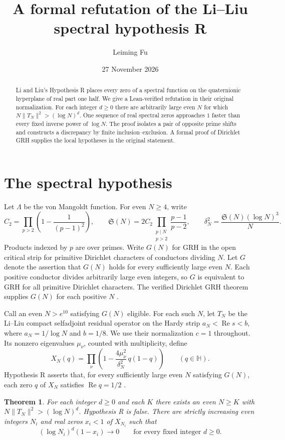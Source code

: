 \documentclass[11pt,a4paper]{article}
\title{A formal refutation of the Li--Liu spectral hypothesis R}
\author{Leiming Fu}
\date{27 November 2026}
\newtheorem{theorem}{Theorem}[section]
\newcommand{\SSg}{\mathfrak S}
\DeclareMathOperator{\Rea}{Re}
\begin{document}
\maketitle
\begin{abstract}
Li and Liu's Hypothesis R places every zero of a spectral function on the quaternionic hyperplane of real part one half. We give a Lean-verified refutation in their original normalization. For each integer $d\ge0$ there are arbitrarily large even $N$ for which $N\|T_N\|^2>(\log N)^d$. One sequence of real spectral zeros approaches $1$ faster than every fixed inverse power of $\log N$. The proof isolates a pair of opposite prime shifts and constructs a discrepancy by finite inclusion--exclusion. A formal proof of Dirichlet GRH supplies the local hypotheses in the original statement.
\end{abstract}

\section{The spectral hypothesis}
Let $\Lambda$ be the von Mangoldt function. For even $N\ge4$, write
\[
 C_2=\prod_{p>2}\left(1-\frac{1}{(p-1)^2}\right),\qquad
 \SSg(N)=2C_2\prod_{\substack{p\mid N\\p>2}}\frac{p-1}{p-2},
 \qquad \delta_N^2=\frac{\SSg(N)(\log N)^3}{N}.
\]
Products indexed by $p$ are over primes. Write $G(N)$ for GRH in the open critical strip for primitive Dirichlet characters of conductors dividing $N$. Let $G$ denote the assertion that $G(N)$ holds for every sufficiently large even $N$. Each positive conductor divides arbitrarily large even integers, so $G$ is equivalent to GRH for all primitive Dirichlet characters. The verified Dirichlet GRH theorem supplies $G(N)$ for each positive $N$ \cite{grh,compact}.

Call an even $N>e^{10}$ satisfying $G(N)$ eligible. For each such $N$, let $T_N$ be the Li--Liu compact selfadjoint residual operator on the Hardy strip $a_N<\Rea s<b$, where $a_N=1/\log N$ and $b=1/8$. We use their normalization $c=1$ throughout. Its nonzero eigenvalues $\mu_\nu$, counted with multiplicity, define
\[
 X_N(q)=\prod_\nu\left(1-\frac{4\mu_\nu^2}{\delta_N^2}\,q(1-q)\right)
 \qquad(q\in\mathbb H).
\]
Hypothesis R asserts that, for every sufficiently large even $N$ satisfying $G(N)$, each zero $q$ of $X_N$ satisfies $\Rea q=1/2$ \cite{LL}.

\begin{theorem}\label{th:growth}
For each integer $d\ge0$ and each $K$ there exists an even $N\ge K$ with
$N\|T_N\|^2>(\log N)^d$. Hypothesis R is false. There are strictly increasing even integers $N_i$ and real zeros $x_i<1$ of $X_{N_i}$ such that
\[
             (\log N_i)^d(1-x_i)\longrightarrow0
             \qquad\text{for every fixed integer }d\ge0.
\]
\end{theorem}
\end{document}
